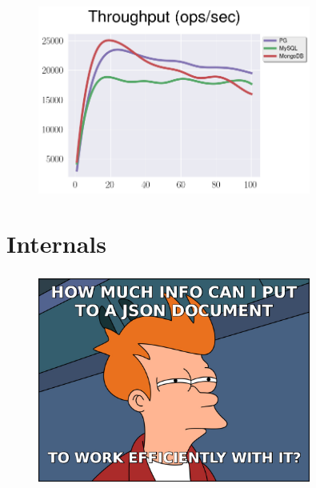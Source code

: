 \documentclass[usenames,dvipsnames, 18pt, compress, aspectratio=169]{beamer}
\begin{document}
\begin{frame}
    \frametitle{}
    \begin{center}
    \vspace{10pt}
    \begin{figure}
        \includegraphics[width=0.8\textwidth,center]{benchmarks/select_btree_throughput.png}
    \end{figure}
    \end{center}
\end{frame}

\fontsize{13pt}{14}\selectfont
\section{Internals}
\fontsize{17pt}{18}\selectfont

\fontsize{17pt}{19}\selectfont
\begin{frame}
    \frametitle{}
    \begin{center}

    \begin{figure}
        \includegraphics[width=0.8\textwidth,center]{fry_disk_json2.jpg}
    \end{figure}

    \end{center}
\end{frame}
\end{document}
